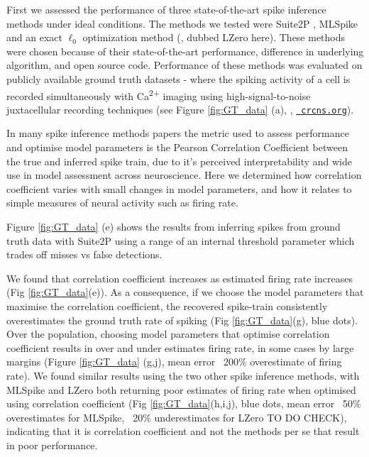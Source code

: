\documentclass[a4paper,10pt,twocolumn]{article}
\begin{document}
First we assessed the performance of three state-of-the-art spike inference methods under ideal conditions. The methods we tested were Suite2P \citep{Pachitariu_undated-ui},  MLSpike \citep{Deneux2016-gu} and an exact $\ell_{0}$ optimization method (\citet{Jewell2017-pr}, dubbed LZero here). These methods were chosen because of their state-of-the-art performance, difference in underlying algorithm, and open source code. Performance of these methods was evaluated on publicly available ground truth datasets - where the spiking activity of a cell is recorded simultaneously with Ca\textsuperscript{2+} imaging using high-signal-to-noise juxtacellular recording techniques (see Figure \ref{fig:GT_data} (a), \citealp{Chen2013-nv}, \href{https://crcns.org/data-sets/methods/cai-1}{\tt{\color{blue} crcns.org}}). 


In many spike inference methods papers \citep{Brown2004-tj, Paiva2010-qv,Theis2016-ee, Reynolds2017-dr, Berens2018-su} the metric used to assess performance and optimise model parameters is the Pearson Correlation Coefficient between the true and inferred spike train, due to it's perceived interpretability and wide use in model assessment across neuroscience. Here we determined how correlation coefficient varies with small changes in model parameters, and how it relates to simple measures of neural activity such as firing rate.

Figure \ref{fig:GT_data} (e) shows the results from inferring spikes from ground truth data with Suite2P \citep{Pachitariu_undated-ui} using a range of an internal threshold parameter which trades off misses vs false detections. 

We found that correlation coefficient increases as estimated firing rate increases (Fig \ref{fig:GT_data}(e)). As a consequence, if we choose the model parameters that maximise the correlation coefficient, the recovered spike-train consistently overestimates the ground truth rate of spiking (Fig \ref{fig:GT_data}(g), blue dots). Over the population, choosing model parameters that optimise correlation coefficient results in over and under estimates firing rate, in some cases by large margins (Figure \ref{fig:GT_data} (g,j), mean error ~200$\%$ overestimate of firing rate). We found similar results using the two other spike inference methods, with MLSpike and LZero both returning poor estimates of firing rate when optimised using correlation coefficient (Fig \ref{fig:GT_data}(h,i,j), blue dots, mean error ~50$\%$ overestimates for MLSpike, ~20$\%$ underestimates for LZero TO DO CHECK), indicating that it is correlation coefficient and not the methods per se that result in poor performance.
\end{document}
